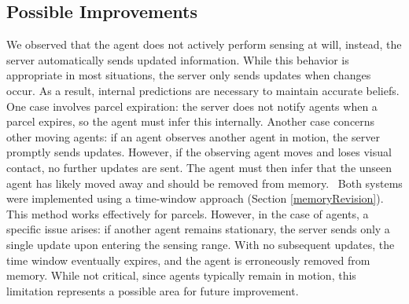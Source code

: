     \subsection{Possible Improvements}
        We observed that the agent does not actively perform sensing at will, instead, the server automatically sends updated information. While this behavior is appropriate in most situations, the server only sends updates when changes occur. As a result, internal predictions are necessary to maintain accurate beliefs. One case involves parcel expiration: the server does not notify agents when a parcel expires, so the agent must infer this internally. Another case concerns other moving agents: if an agent observes another agent in motion, the server promptly sends updates. However, if the observing agent moves and loses visual contact, no further updates are sent. The agent must then infer that the unseen agent has likely moved away and should be removed from memory.
        \medskip\
        Both systems were implemented using a time-window approach (Section \ref{memoryRevision}). This method works effectively for parcels. However, in the case of agents, a specific issue arises: if another agent remains stationary, the server sends only a single update upon entering the sensing range. With no subsequent updates, the time window eventually expires, and the agent is erroneously removed from memory. While not critical, since agents typically remain in motion, this limitation represents a possible area for future improvement.

\newpage

